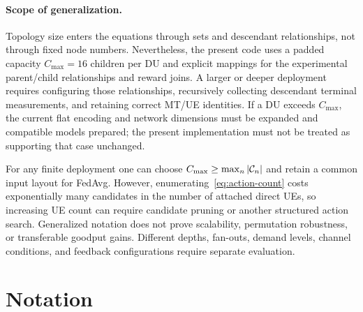 \begin{EnChapter}
\paragraph{Scope of generalization.}
Topology size enters the equations through sets and descendant relationships,
not through fixed node numbers. Nevertheless, the present code uses a padded
capacity $C_{\max}=16$ children per DU and explicit mappings for the experimental
parent/child relationships and reward joins. A larger or deeper deployment
requires configuring those relationships, recursively collecting descendant
terminal measurements, and retaining correct MT/UE identities. If a DU exceeds
$C_{\max}$, the current flat encoding and network dimensions must be expanded
and compatible models prepared; the present implementation must not be treated
as supporting that case unchanged.

For any finite deployment one can choose
$C_{\max}\ge\max_n|\mathcal{C}_n|$ and retain a common input layout for FedAvg.
However, enumerating~\eqref{eq:action-count} costs exponentially many candidates
in the number of attached direct UEs, so increasing UE count can require
candidate pruning or another structured action search. Generalized notation does
not prove scalability, permutation robustness, or transferable goodput gains.
Different depths, fan-outs, demand levels, channel conditions, and feedback
configurations require separate evaluation.

\section{Notation}
\label{subsec:notation}


\end{EnChapter}
